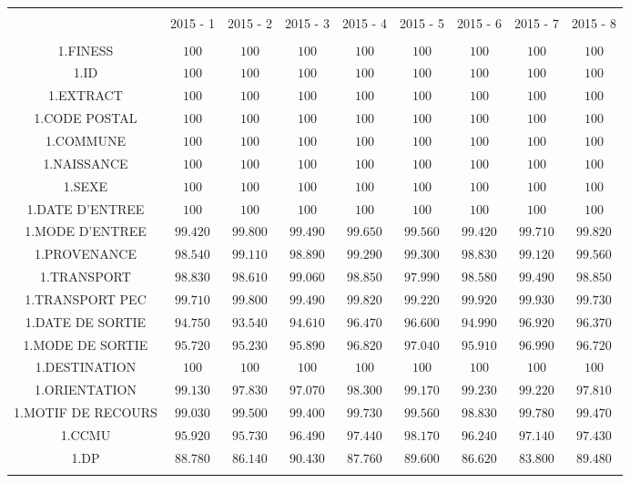 \documentclass[]{article}
\begin{document}
\begin{table}[!htbp] \centering 
  \caption{} 
  \label{} 
\begin{tabular}{@{\extracolsep{5pt}} ccccccccc} 
\\[-1.8ex]\hline 
\hline \\[-1.8ex] 
 & 2015 - 1 & 2015 - 2 & 2015 - 3 & 2015 - 4 & 2015 - 5 & 2015 - 6 & 2015 - 7 & 2015 - 8 \\ 
\hline \\[-1.8ex] 
1.FINESS & $100$ & $100$ & $100$ & $100$ & $100$ & $100$ & $100$ & $100$ \\ 
1.ID & $100$ & $100$ & $100$ & $100$ & $100$ & $100$ & $100$ & $100$ \\ 
1.EXTRACT & $100$ & $100$ & $100$ & $100$ & $100$ & $100$ & $100$ & $100$ \\ 
1.CODE POSTAL & $100$ & $100$ & $100$ & $100$ & $100$ & $100$ & $100$ & $100$ \\ 
1.COMMUNE & $100$ & $100$ & $100$ & $100$ & $100$ & $100$ & $100$ & $100$ \\ 
1.NAISSANCE & $100$ & $100$ & $100$ & $100$ & $100$ & $100$ & $100$ & $100$ \\ 
1.SEXE & $100$ & $100$ & $100$ & $100$ & $100$ & $100$ & $100$ & $100$ \\ 
1.DATE D'ENTREE & $100$ & $100$ & $100$ & $100$ & $100$ & $100$ & $100$ & $100$ \\ 
1.MODE D'ENTREE & $99.420$ & $99.800$ & $99.490$ & $99.650$ & $99.560$ & $99.420$ & $99.710$ & $99.820$ \\ 
1.PROVENANCE & $98.540$ & $99.110$ & $98.890$ & $99.290$ & $99.300$ & $98.830$ & $99.120$ & $99.560$ \\ 
1.TRANSPORT & $98.830$ & $98.610$ & $99.060$ & $98.850$ & $97.990$ & $98.580$ & $99.490$ & $98.850$ \\ 
1.TRANSPORT PEC & $99.710$ & $99.800$ & $99.490$ & $99.820$ & $99.220$ & $99.920$ & $99.930$ & $99.730$ \\ 
1.DATE DE SORTIE & $94.750$ & $93.540$ & $94.610$ & $96.470$ & $96.600$ & $94.990$ & $96.920$ & $96.370$ \\ 
1.MODE DE SORTIE & $95.720$ & $95.230$ & $95.890$ & $96.820$ & $97.040$ & $95.910$ & $96.990$ & $96.720$ \\ 
1.DESTINATION & $100$ & $100$ & $100$ & $100$ & $100$ & $100$ & $100$ & $100$ \\ 
1.ORIENTATION & $99.130$ & $97.830$ & $97.070$ & $98.300$ & $99.170$ & $99.230$ & $99.220$ & $97.810$ \\ 
1.MOTIF DE RECOURS & $99.030$ & $99.500$ & $99.400$ & $99.730$ & $99.560$ & $98.830$ & $99.780$ & $99.470$ \\ 
1.CCMU & $95.920$ & $95.730$ & $96.490$ & $97.440$ & $98.170$ & $96.240$ & $97.140$ & $97.430$ \\ 
1.DP & $88.780$ & $86.140$ & $90.430$ & $87.760$ & $89.600$ & $86.620$ & $83.800$ & $89.480$ \\ 
\hline \\[-1.8ex] 
\end{tabular} 
\end{table}
\end{document}
